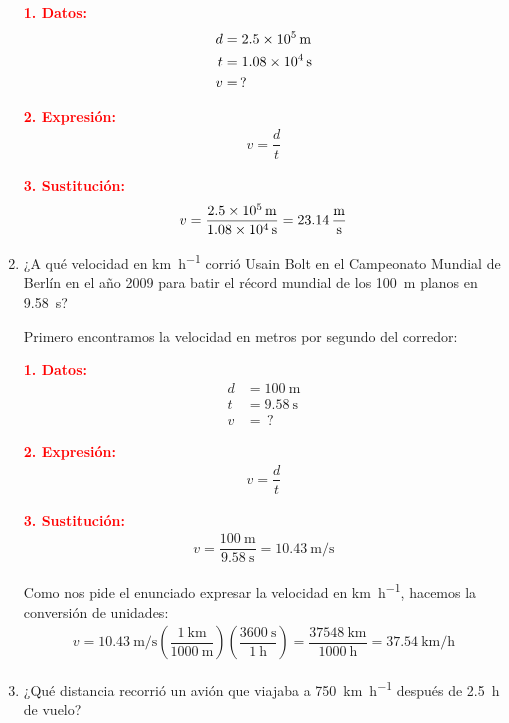 \documentclass[14pt]{extarticle}
\newcommand{\textocolor}[2]{\textbf{\textcolor{#1}{#2}}}
\begin{document}
\begin{enumerate}
\begin{minipage}[t]{0.4\linewidth}
\textocolor{red}{1. Datos:}
\begin{align*}
d &= \SI{2.5d5}{\meter} \\
t &= \SI{1.08d4}{\second} \\
v &= \, ?
\end{align*}
\end{minipage}
\hspace{1cm}
\begin{minipage}[t]{0.4\linewidth}
\textocolor{red}{2. Expresión:}
\begin{align*}
v = \dfrac{d}{t}
\end{align*}
\end{minipage}

\textocolor{red}{3. Sustitución:}
\begin{align*}
v = \dfrac{\SI{2.5d5}{\meter}}{\SI{1.08d4}{\second}} = \SI[per-mode=fraction]{23.14}{\meter\per\second}
\end{align*}
\item ¿A qué velocidad en \unit{\kilo\meter\per\hour} corrió Usain Bolt en el Campeonato Mundial de Berlín en el año 2009 para batir el récord mundial de los \SI{100}{\meter} planos en \SI{9.58}{\second}?

Primero encontramos la velocidad en metros por segundo del corredor:

\begin{minipage}[t]{0.4\linewidth}
\textocolor{red}{1. Datos:}
\begin{align*}
d &= \SI{100}{\meter} \\
t &= \SI{9.58}{\second} \\
v &= \, ?
\end{align*}
\end{minipage}
\hspace{1cm}
\begin{minipage}[t]{0.4\linewidth}
\textocolor{red}{2. Expresión:}
\begin{align*}
v = \dfrac{d}{t}
\end{align*}
\end{minipage}

\textocolor{red}{3. Sustitución:}
\begin{align*}
v = \dfrac{\SI{100}{\meter}}{\SI{9.58}{\second}} = \SI[per-mode=fraction]{10.43}{\meter\per\second}
\end{align*}

Como nos pide el enunciado expresar la velocidad en \unit{\kilo\meter\per\hour}, hacemos la conversión de unidades:
\begin{align*}
v = \SI[per-mode=fraction]{10.43}{\meter\per\second} \left( \dfrac{\SI{1}{\kilo\meter}}{\SI{1000}{\meter}} \right) \left( \dfrac{\SI{3600}{\second}}{\SI{1}{\hour}} \right) = \dfrac{\SI{37548}{\kilo\meter}}{\SI{1000}{\hour}} = \SI[per-mode=fraction]{37.54}{\kilo\meter\per\hour}
\end{align*}
\item ¿Qué distancia recorrió un avión que viajaba a \SI{750}{\kilo\meter\per\hour} después de \SI{2.5}{\hour} de vuelo?


\end{enumerate}
\end{document}
